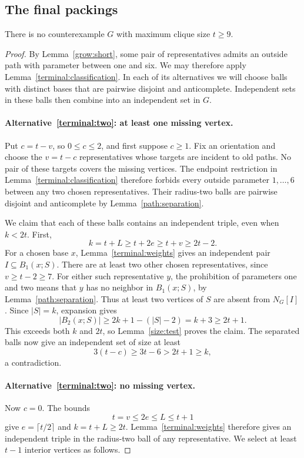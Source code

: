 \subsection{The final packings}

\begin{proposition}\label{terminal:contradiction}
There is no counterexample \(G\) with maximum clique size \(t\ge9\).
\end{proposition}

\begin{proof}
By Lemma~\ref{grow:short}, some pair of representatives admits an outside
path with parameter between one and six.  We may therefore apply
Lemma~\ref{terminal:classification}.  In each of its alternatives we will
choose balls with distinct bases that are pairwise disjoint and
anticomplete.  Independent sets in these balls then combine into an
independent set in \(G\).

\paragraph{Alternative~\ref{terminal:two}: at least one missing vertex.}
Put \(c=t-v\), so \(0\le c\le2\), and first suppose \(c\ge1\).
Fix an orientation and choose the \(v=t-c\) representatives whose targets
are incident to old paths.  No pair of these targets covers the missing
vertices.  The endpoint restriction in
Lemma~\ref{terminal:classification} therefore forbids every outside
parameter \(1,\ldots,6\) between any two chosen representatives.
Their radius-two balls are pairwise disjoint and anticomplete by
Lemma~\ref{path:separation}.

We claim that each of these balls contains an independent triple, even
when \(k<2t\).  First,
\[
 k=t+L\ge t+2e\ge t+v\ge2t-2.
\]
For a chosen base \(x\), Lemma~\ref{terminal:weights} gives an independent
pair \(I\subseteq B_1(x;S)\).
There are at least two other chosen representatives, since
\(v\ge t-2\ge7\).  For either such representative \(y\), the prohibition of
parameters one and two means that \(y\) has no neighbor in \(B_1(x;S)\),
by Lemma~\ref{path:separation}.  Thus at least two vertices of \(S\) are
absent from \(N_G[I]\).  Since \(|S|=k\), expansion gives
\[
 |B_2(x;S)|\ge2k+1-(|S|-2)=k+3\ge2t+1.
\]
This exceeds both \(k\) and \(2t\), so Lemma~\ref{size:test} proves the
claim.  The separated balls now give an independent set of size at least
\[
 3(t-c)\ge3t-6>2t+1\ge k,
\]
a contradiction.

\paragraph{Alternative~\ref{terminal:two}: no missing vertex.}
Now \(c=0\).  The bounds
\[
 t=v\le2e\le L\le t+1
\]
give \(e=\lceil t/2\rceil\) and \(k=t+L\ge2t\).
Lemma~\ref{terminal:weights} therefore gives an independent triple in the
radius-two ball of any representative.
We select at least \(t-1\) interior vertices as follows.


\end{proof}
